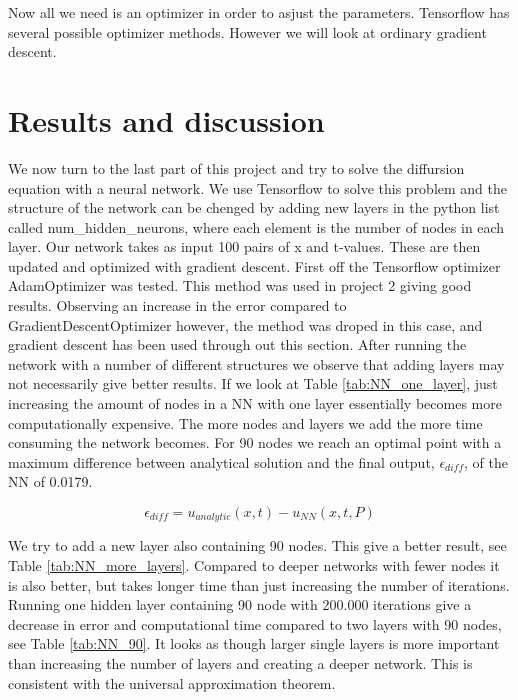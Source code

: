 \documentclass[a4paper, twocolumn]{article}
\newcommand{\tab}[1]{Table \ref{tab:#1}}
\begin{document}
Now all we need is an optimizer in order to asjust the parameters. Tensorflow has several possible optimizer methods. However we will look at ordinary gradient descent.

\section{Results and discussion}
We now turn to the last part of this project and try to solve the diffursion equation with a neural network. We use Tensorflow to solve this problem and the structure of the network can be chenged by adding new layers in the python list called num\_hidden\_neurons, where each element is the number of nodes in each layer. Our network takes as input 100 pairs of x and t-values. These are then updated and optimized with gradient descent. 
First off the Tensorflow optimizer AdamOptimizer was tested. This method was used in project 2 giving good results. Observing an increase in the error compared to GradientDescentOptimizer however, the method was droped in this case, and gradient descent has been used through out this section.
After running the network with a number of different structures we observe that adding layers may not necessarily give better results. If we look at \tab{NN_one_layer}, just increasing the amount of nodes in a NN with one layer essentially becomes more computationally expensive. The more nodes and layers we add the more time consuming the network becomes. For 90 nodes we reach an optimal point with a maximum difference between analytical solution and the final output, $\epsilon_{diff}$, of the NN of 0.0179. 

\begin{equation}
\epsilon_{diff} = u_{analytic}(x,t) - u_{NN}(x,t,P)
\end{equation}

We try to add a new layer also containing 90 nodes. This give a better result, see \tab{NN_more_layers}. Compared to deeper networks with fewer nodes it is also better, but takes longer time than just increasing the number of iterations. Running one hidden layer containing 90 node with 200.000 iterations give a decrease in error and computational time compared to two layers with 90 nodes, see \tab{NN_90}.
It looks as though larger single layers is more important than increasing the number of layers and creating a deeper network. This is consistent with the universal approximation theorem.
\end{document}
